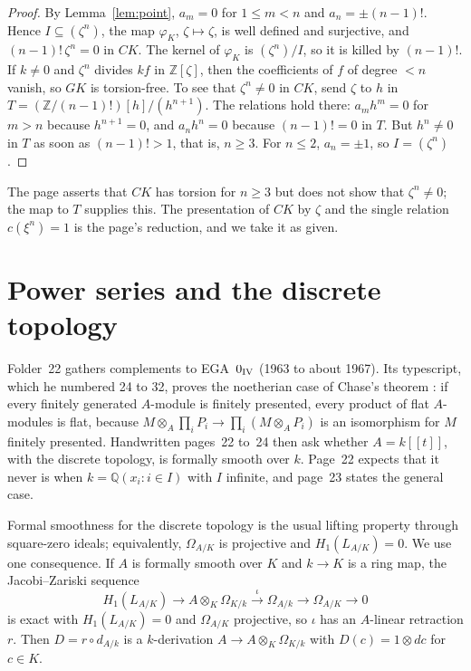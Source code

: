 \documentclass[11pt,a4paper]{amsart}
\theoremstyle{definition}
\theoremstyle{remark}
\newcommand{\Z}{\mathbb Z}
\newcommand{\Q}{\mathbb Q}
\begin{document}
\begin{proof}
By Lemma~\ref{lem:point}, $a_m = 0$ for $1 \le m < n$ and $a_n = \pm(n-1)!$. Hence $I \subseteq (\zeta^n)$, the map $\varphi_K$, $\zeta \mapsto \zeta$, is well defined and surjective, and $(n-1)!\,\zeta^n = 0$ in $CK$. The kernel of $\varphi_K$ is $(\zeta^n)/I$, so it is killed by $(n-1)!$. If $k \ne 0$ and $\zeta^n$ divides $kf$ in $\Z[\zeta]$, then the coefficients of $f$ of degree $< n$ vanish, so $GK$ is torsion-free. To see that $\zeta^n \ne 0$ in $CK$, send $\zeta$ to $h$ in $T = (\Z/(n-1)!)[h]/(h^{n+1})$. The relations hold there: $a_mh^m = 0$ for $m > n$ because $h^{n+1} = 0$, and $a_nh^n = 0$ because $(n-1)! = 0$ in $T$. But $h^n \ne 0$ in $T$ as soon as $(n-1)! > 1$, that is, $n \ge 3$. For $n \le 2$, $a_n = \pm1$, so $I = (\zeta^n)$.
\end{proof}

The page asserts that $CK$ has torsion for $n \ge 3$ but does not show that $\zeta^n \ne 0$; the map to $T$ supplies this. The presentation of $CK$ by $\zeta$ and the single relation $c(\xi^n) = 1$ is the page's reduction, and we take it as given.

\section{Power series and the discrete topology}\label{sec:power}

Folder~22 gathers complements to EGA~$0_{\rm IV}$ (1963 to about 1967). Its typescript, which he numbered 24 to 32, proves the noetherian case of Chase's theorem \cite{chase1960}: if every finitely generated $A$-module is finitely presented, every product of flat $A$-modules is flat, because $M \otimes_A \prod_i P_i \to \prod_i(M \otimes_A P_i)$ is an isomorphism for $M$ finitely presented. Handwritten pages~22 to~24 then ask whether $A = k[[t]]$, with the discrete topology, is formally smooth over $k$. Page~22 expects that it never is when $k = \Q(x_i : i \in I)$ with $I$ infinite, and page~23 states the general case.

Formal smoothness for the discrete topology is the usual lifting property through square-zero ideals; equivalently, $\Omega_{A/K}$ is projective and $H_1(L_{A/K}) = 0$. We use one consequence. If $A$ is formally smooth over $K$ and $k \to K$ is a ring map, the Jacobi--Zariski sequence
\[
H_1(L_{A/K}) \to A \otimes_K \Omega_{K/k} \xrightarrow{\ \iota\ } \Omega_{A/k} \to \Omega_{A/K} \to 0
\]
is exact with $H_1(L_{A/K}) = 0$ and $\Omega_{A/K}$ projective, so $\iota$ has an $A$-linear retraction $r$. Then $D = r \circ d_{A/k}$ is a $k$-derivation $A \to A \otimes_K \Omega_{K/k}$ with $D(c) = 1 \otimes dc$ for $c \in K$.
\end{document}
